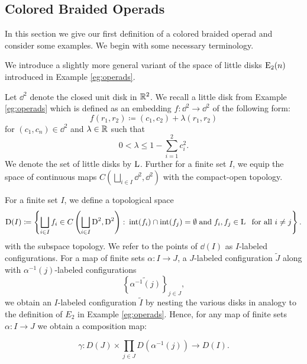 \subsection{Colored Braided Operads}

In this section we give our first definition of a colored braided operad and
consider some examples. We begin with some necessary terminology.

We introduce a slightly more general variant of the space of little disks
$\operatorname{E}_2(n)$ introduced in Example \ref{eg:operads}.

Let $\dd^2$ denote the closed unit disk in $\mathbb{R}^2$. We recall a little disk from
Example \ref{eg:operads} which is defined as an embedding $f \colon \dd^2 \to
\dd^2$ of the following form:
\[
    f(r_1, r_2) \coloneqq (c_1, c_2) + \lambda(r_1, r_2)
\]
for $(c_1, c_n) \in \dd^2$ and $\lambda \in \mathbb{R}$ such that
\[
    0 < \lambda \leq 1 - \sum_{i=1}^{2} c_i^2.     
\]
We denote the set of little disks by $\operatorname{L}$. Further for a finite set $I$, we
equip the space of continuous maps $C\left(\bigsqcup_{i \in I} \dd^2,
\dd^2\right)$ with the compact-open topology.

\begin{defin}\label{def:ilabeled} For a finite set $I$, we define a topological
space
\[
    \operatorname{D}(I) \coloneqq \left\{ \bigsqcup_{i \in I} f_i \in C\left(\bigsqcup_{i \in I} \operatorname{D}^2, \operatorname{D}^2\right) \colon \operatorname{int}(f_i) \cap \operatorname{int}(f_j) = \emptyset  \; \text{and} \; f_i, f_j \in \operatorname{L} \; \text{ for all } i \not= j\right\}.
\]
with the subspace topology. We refer to the points of $\dd(I)$ as $I$-labeled
configurations. 
For a map of finite sets $\alpha \colon I \to J$, a $J$-labeled configuration
$\widetilde{J}$ along with $\alpha^{-1}(j)$-labeled configurations 
$$\left\{\widetilde{\alpha^{-1}(j)}\right\}_{j \in J},$$ we obtain an
$I$-labeled configuration $\widetilde{I}$ by nesting the various disks in
analogy to the definition of $E_2$ in Example \ref{eg:operads}. Hence, for any
map of finite sets $\alpha \colon I \to J$ we obtain a composition map:

\begin{equation}\label{eq:defcomp}
    \gamma: D(J) \times \prod_{j \in J} D(\alpha^{-1}(j)) \to D(I).
\end{equation}
\end{defin}

